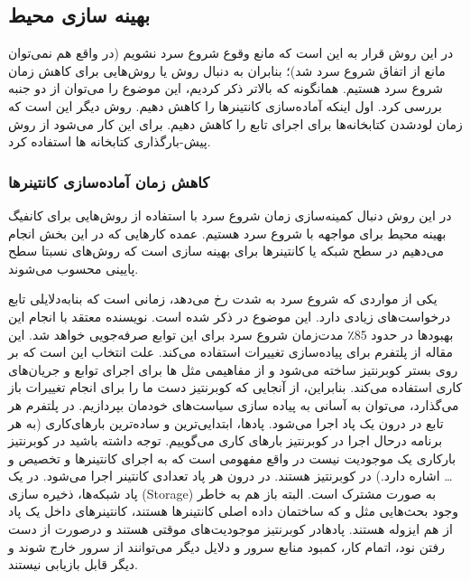 \subsection{ بهینه سازی محیط}
          
          در این روش قرار به این است که مانع وقوع شروع سرد نشویم (در واقع هم نمی‌توان مانع از اتفاق شروع سرد شد)؛ بنابران به دنبال روش‌ یا روش‌هایی برای کاهش زمان شروع سرد هستیم. همانگونه که بالاتر ذکر کردیم، این موضوع را می‌توان از دو جنبه بررسی کرد. اول اینکه آماده‌سازی کانتینر‌ها را کاهش دهیم. روش دیگر این است که زمان لودشدن کتابخانه‌ها برای اجرای تابع را کاهش دهیم. برای این کار می‌شود از روش پیش-بارگذاری کتابخانه ها استفاده کرد.  
          
\subsubsection{کاهش زمان آماده‌سازی کانتینرها}

در این روش دنبال کمینه‌سازی زمان شروع سرد با استفاده از روش‌هایی برای کانفیگ بهینه محیط برای مواجهه با شروع سرد هستیم. عمده کارهایی که در این بخش انجام می‌دهیم در سطح شبکه یا کانتینر‌ها برای بهینه سازی است که روش‌های نسبتا سطح پایینی محسوب می‌شوند. 

یکی از مواردی که شروع سرد به شدت رخ می‌دهد، زمانی است که بنابه‌دلایلی تابع درخواست‌های زیادی دارد. این موضوع در \cite{lin2019mitigating} ذکر شده است. نویسنده معتقد با انجام این بهبودها در حدود 85٪ مدت‌زمان شروع سرد برای این توابع صرفه‌جویی خواهد شد. این مقاله از پلتفرم  برای پیاده‌سازی تغییرات استفاده می‌کند. علت انتخاب  این است که بر روی بستر کوبرنتیز ساخته می‌شود و از مفاهیمی مثل  ها برای اجرای توابع و جریان‌های کاری استفاده می‌کند. بنابراین، از آنجایی که کوبرنتیز دست ما را برای انجام تغییرات باز می‌گذارد، می‌توان به آسانی به پیاده سازی سیاست‌های خودمان بپردازیم. در پلتفرم  هر تابع در درون یک پاد اجرا می‌شود. پادها، ابتدایی‌ترین و ساده‌ترین بارهای‌کاری (به هر برنامه درحال اجرا در کوبرنتیز بارهای کاری می‌گوییم. توجه داشته باشید در کوبرنتیز بارکاری یک موجودیت نیست در واقع مفهومی است که به اجرای کانتینر‌ها و تخصیص  و … اشاره دارد.) در کوبرنتیز هستند. در درون هر پاد تعدادی کانتینر اجرا می‌شود. در یک پاد شبکه‌ها، ذخیره سازی (Storage)‌ به صورت مشترک است. البته باز هم به خاطر وجود بحث‌هایی مثل  و  که ساختمان داده اصلی کانتینرها هستند، کانتینرهای داخل یک پاد از هم ایزوله هستند. پادهادر کوبرنتیز موجودیت‌های موقتی هستند و درصورت از دست رفتن نود، اتمام کار، کمبود منابع سرور و دلایل دیگر می‌توانند از سرور خارج شوند و دیگر قابل بازیابی نیستند. 

